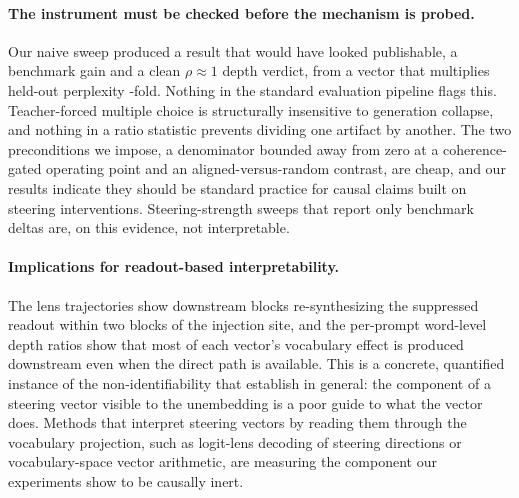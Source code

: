 \paragraph{The instrument must be checked before the mechanism is probed.}
Our naive sweep produced a result that would have looked publishable, a benchmark gain and a clean $\rho \approx 1$ depth verdict, from a vector that multiplies held-out perplexity \NaivePplRatio-fold. Nothing in the standard evaluation pipeline flags this. Teacher-forced multiple choice is structurally insensitive to generation collapse, and nothing in a ratio statistic prevents dividing one artifact by another. The two preconditions we impose, a denominator bounded away from zero at a coherence-gated operating point and an aligned-versus-random contrast, are cheap, and our results indicate they should be standard practice for causal claims built on steering interventions. Steering-strength sweeps that report only benchmark deltas are, on this evidence, not interpretable.

\paragraph{Implications for readout-based interpretability.}
The lens trajectories show downstream blocks re-synthesizing the suppressed readout within two blocks of the injection site, and the per-prompt word-level depth ratios show that most of each vector's vocabulary effect is produced downstream even when the direct path is available. This is a concrete, quantified instance of the non-identifiability that \citet{venkatesh2026nonid} establish in general: the component of a steering vector visible to the unembedding is a poor guide to what the vector does. Methods that interpret steering vectors by reading them through the vocabulary projection, such as logit-lens decoding of steering directions or vocabulary-space vector arithmetic, are measuring the component our experiments show to be causally inert.
